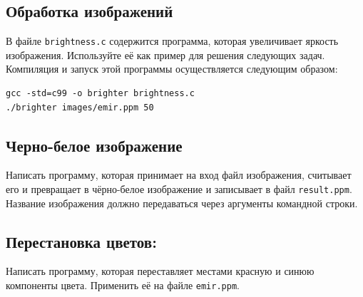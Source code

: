 \documentclass{article}
\begin{document}
\subsection*{Обработка изображений}
В файле \texttt{brightness.c} содержится программа, которая увеличивает яркость изображения. Используйте её как пример для решения следующих задач. Компиляция и запуск этой программы осуществляется следующим образом:
\begin{verbatim}
gcc -std=c99 -o brighter brightness.c
./brighter images/emir.ppm 50
\end{verbatim}

\subsection{Черно-белое изображение} 
Написать программу, которая принимает на вход файл изображения, считывает его и превращает в чёрно-белое изображение и записывает в файл \texttt{result.ppm}. Название изображения должно передаваться через аргументы командной строки.

\subsection{Перестановка цветов:} Написать программу, которая переставляет местами красную и синюю компоненты цвета. Применить её на файле \texttt{emir.ppm}.
\end{document}
